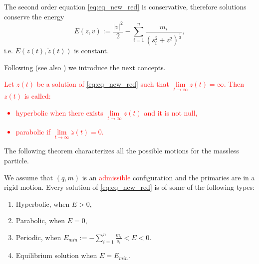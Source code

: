 \documentclass[smallcondensed]{svjour3}
\begin{document}
The second order equation \eqref{eq:eq_new_red} is conservative, therefore solutions conserve the energy
\begin{equation}\label{eq:conser.energ}
E(z,v):=\frac{|v|^2}{2}-\sum_{i=1}^{n} \frac{m_i}{\left(s_i^2+z^2\right)^{\frac12}},
\end{equation}
i.e. $E(z(t),\dot{z}(t))$ is constant.



Following \cite{VladimirI.Arnold229} (see also \cite{marchesin2013spatial})  we introduce the next concepts.
\textcolor{red}{
\begin{definition}[Chazy, 1922]
 Let  $z(t)$  be a solution of \eqref{eq:eq_new_red} such that $\lim\limits_{t\to\infty}z(t)=\infty$. Then $z(t)$ is called:
 \begin{itemize}
  \item   hyperbolic when there exists $\lim\limits_{t\to\infty}\dot{z}(t)$ and it is not null,
  \item  parabolic if $\lim\limits_{t\to\infty}\dot{z}(t)=0$.
 \end{itemize}
\end{definition}
}





The following theorem characterizes all the possible motions for the massless particle.

\begin{theorem}\label{thm:prin_ine} We assume that $(q,m)$ is an \textcolor{red}{admissible}  configuration and the primaries are in a rigid motion. Every solution of \eqref{eq:eq_new_red} is of some of the following types:
\begin{enumerate}
\item\label{1} Hyperbolic, when $E>0$,
\item\label{2} Parabolic, when $E=0$,
\item\label{3} Periodic, when $E_{min}:=-\sum_{i=1}^{n}\frac{m_i}{s_i}<E<0$.
\item\label{4} Equilibrium solution when $E=E_{min}$.
\end{enumerate}
\end{theorem}
\end{document}
